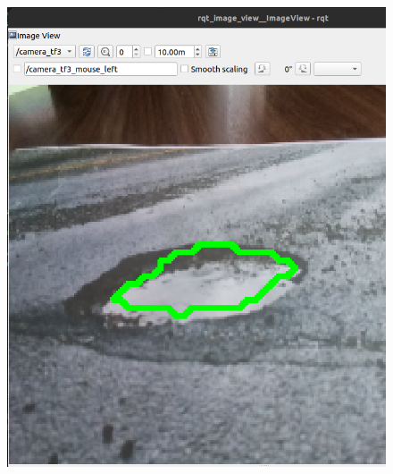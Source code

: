 \begin{figure}[ht!]
	\centering
	\begin{minipage}{0.3\linewidth}
		\centering
		\includegraphics[width=\linewidth]{figs/cap6/contornobache1.png}
	\end{minipage}
	\hspace{2 cm}
	\begin{minipage}{0.3\linewidth}
		\centering

\end{minipage}
\end{figure}
